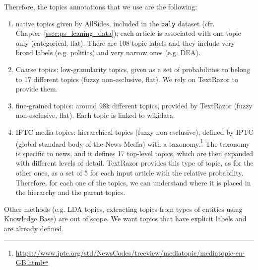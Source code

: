 Therefore, the topics annotations that we use are the following:

\begin{enumerate}
    \item native topics given by AllSides, included in the \texttt{baly} dataset (cfr. Chapter~\ref{ssec:ps_leaning_data}); each article is associated with one topic only (categorical, flat). There are 108 topic labels and they include very broad labels (e.g. politics) and very narrow ones (e.g. DEA).
    \item Coarse topics: low-granularity topics, given as a set of probabilities to belong to 17 different topics (fuzzy non-esclusive, flat). We rely on TextRazor to provide them.
    \item fine-grained topics: around 98k different topics, provided by TextRazor (fuzzy non-esclusive, flat). Each topic is linked to wikidata.
    \item IPTC media topics: hierarchical topics (fuzzy non-esclusive),
    defined by IPTC (global standard body of the News Media) with a taxonomy.\footnote{\url{https://www.iptc.org/std/NewsCodes/treeview/mediatopic/mediatopic-en-GB.html}}
    The taxonomy is specific to news, and it defines 17 top-level topics, which are then expanded with different levels of detail. TextRazor provides this type of topic, as for the other ones, as a set of 5 for each input article with the relative probability.
    Therefore, for each one of the topics, we can understand where it is placed in the hierarchy and the parent topics.
\end{enumerate}



Other methods (e.g. LDA topics, extracting topics from types of entities using Knowledge Base) are out of scope. We want topics that have explicit labels and are already defined.

